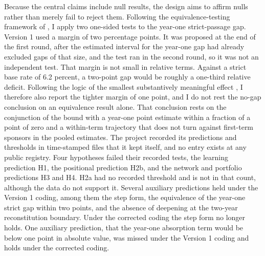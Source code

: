 \documentclass[11pt]{article}
\begin{document}
Because the central claims include null results, the design aims to affirm nulls rather than merely fail to reject them. Following the equivalence-testing framework of \citet{hartman2018}, I apply two one-sided tests to the year-one strict-passage gap. Version 1 used a margin of two percentage points. It was proposed at the end of the first round, after the estimated interval for the year-one gap had already excluded gaps of that size, and the test ran in the second round, so it was not an independent test. That margin is not small in relative terms. Against a strict base rate of 6.2 percent, a two-point gap would be roughly a one-third relative deficit. Following the logic of the smallest substantively meaningful effect \citep{rainey2014}, I therefore also report the tighter margin of one point, and I do not rest the no-gap conclusion on an equivalence result alone. That conclusion rests on the conjunction of the bound with a year-one point estimate within a fraction of a point of zero and a within-term trajectory that does not turn against first-term sponsors in the pooled estimates. The project recorded its predictions and thresholds in time-stamped files that it kept itself, and no entry exists at any public registry. Four hypotheses failed their recorded tests, the learning prediction H1, the positional prediction H2b, and the network and portfolio predictions H3 and H4. H2a had no recorded threshold and is not in that count, although the data do not support it. Several auxiliary predictions held under the Version 1 coding, among them the step form, the equivalence of the year-one strict gap within two points, and the absence of deepening at the two-year reconstitution boundary. Under the corrected coding the step form no longer holds. One auxiliary prediction, that the year-one absorption term would be below one point in absolute value, was missed under the Version 1 coding and holds under the corrected coding.
\end{document}
